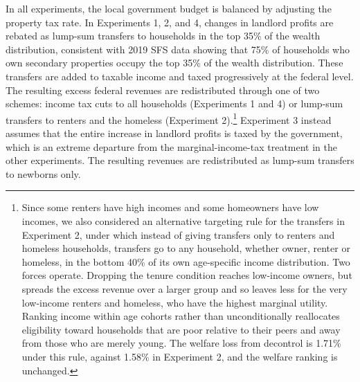\documentclass[parskip=full]{article}
\begin{document}
In all experiments, the local government budget is balanced by adjusting the property tax rate. In Experiments 1, 2, and 4, changes in landlord profits are rebated as lump-sum transfers to households in the top 35\% of the wealth distribution, consistent with 2019 SFS data showing that 75\% of households who own secondary properties occupy the top 35\% of the wealth distribution. These transfers are added to taxable income and taxed progressively at the federal level. The resulting excess federal revenues are redistributed through one of two schemes: income tax cuts to all households (Experiments 1 and 4) or lump-sum transfers to renters and the homeless (Experiment 2).\footnote{Since some renters have high incomes and some homeowners have low incomes, we also considered an alternative targeting rule for the transfers in Experiment 2, under which instead of giving transfers only to renters and homeless households, transfers go to any household, whether owner, renter or homeless, in the bottom 40\% of its own age-specific income distribution. Two forces operate. Dropping the tenure condition reaches low-income owners, but spreads the excess revenue over a larger group and so leaves less for the very low-income renters and homeless, who have the highest marginal utility. Ranking income within age cohorts rather than unconditionally reallocates eligibility toward households that are poor relative to their peers and away from those who are merely young. The welfare loss from decontrol is 1.71\% under this rule, against 1.58\% in Experiment 2, and the welfare ranking is unchanged.} Experiment 3 instead assumes that the entire increase in landlord profits is taxed by the government, which is an extreme departure from the marginal-income-tax treatment in the other experiments. The resulting revenues are redistributed as lump-sum transfers to newborns only.
\end{document}
